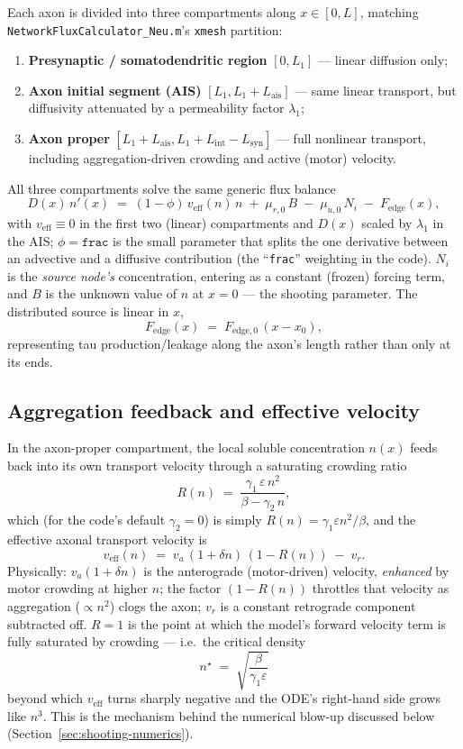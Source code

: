 ﻿\documentclass[11pt]{article}
\begin{document}
Each axon is divided into three compartments along $x\in[0,L]$, matching
\texttt{NetworkFluxCalculator\_Neu.m}'s \texttt{xmesh} partition:
\begin{enumerate}
  \item \textbf{Presynaptic / somatodendritic region} $[0,L_1]$ --- linear
  diffusion only;
  \item \textbf{Axon initial segment (AIS)} $[L_1, L_1+L_{\mathrm{ais}}]$ ---
  same linear transport, but diffusivity attenuated by a permeability factor
  $\lambda_1$;
  \item \textbf{Axon proper} $[L_1+L_{\mathrm{ais}}, L_1+L_{\mathrm{int}}-L_{\mathrm{syn}}]$
  --- full nonlinear transport, including aggregation-driven crowding and
  active (motor) velocity.
\end{enumerate}
All three compartments solve the same generic flux balance
\[
  D(x)\,n'(x) \;=\; (1-\phi)\,v_{\mathrm{eff}}(n)\,n \;+\; \mu_{r,0}\,B \;-\; \mu_{u,0}\,N_i \;-\; F_{\mathrm{edge}}(x),
\]
with $v_{\mathrm{eff}}\equiv 0$ in the first two (linear) compartments and
$D(x)$ scaled by $\lambda_1$ in the AIS; $\phi = \texttt{frac}$ is the small
parameter that splits the one derivative between an advective and a diffusive
contribution (the ``\texttt{frac}'' weighting in the code). $N_i$ is the
\emph{source node's} concentration, entering as a constant (frozen) forcing
term, and $B$ is the unknown value of $n$ at $x=0$ --- the shooting
parameter. The distributed source is linear in $x$,
\[
  F_{\mathrm{edge}}(x) \;=\; F_{\mathrm{edge},0}\,(x-x_0),
\]
representing tau production/leakage along the axon's length rather than only
at its ends.

\subsection{Aggregation feedback and effective velocity}

In the axon-proper compartment, the local soluble concentration $n(x)$ feeds
back into its own transport velocity through a saturating crowding ratio
\[
  R(n) \;=\; \frac{\gamma_1\,\varepsilon\,n^2}{\beta - \gamma_2\,n},
\]
which (for the code's default $\gamma_2=0$) is simply $R(n)=\gamma_1\varepsilon n^2/\beta$,
and the effective axonal transport velocity is
\[
  v_{\mathrm{eff}}(n) \;=\; v_a\,(1+\delta n)\,(1-R(n)) \;-\; v_r .
\]
Physically: $v_a(1+\delta n)$ is the anterograde (motor-driven) velocity,
\emph{enhanced} by motor crowding at higher $n$; the factor $(1-R(n))$ throttles
that velocity as aggregation ($\propto n^2$) clogs the axon; $v_r$ is a constant
retrograde component subtracted off. $R=1$ is the point at which the model's
forward velocity term is fully saturated by crowding --- i.e.\ the critical
density
\[
  n^\star \;=\; \sqrt{\frac{\beta}{\gamma_1\varepsilon}}
\]
beyond which $v_{\mathrm{eff}}$ turns sharply negative and the ODE's right-hand
side grows like $n^3$. This is the mechanism behind the numerical blow-up
discussed below (Section~\ref{sec:shooting-numerics}).
\end{document}

